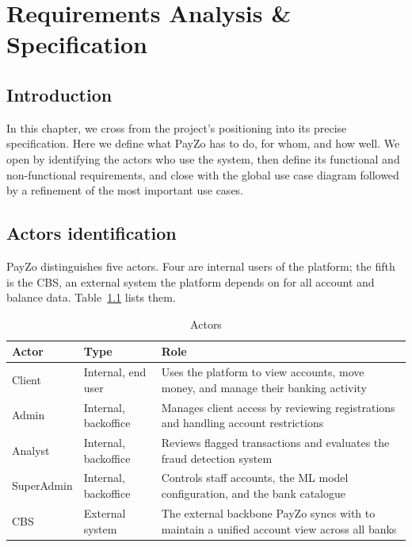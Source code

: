 \documentclass[12pt,a4paper]{report}
\begin{document}
\chapter{Requirements Analysis \& Specification}
\label{chap:requirements}

\section{Introduction}

In this chapter, we cross from the project's positioning into its precise specification. Here
we define what PayZo has to do, for whom, and how well. We open by identifying the actors
who use the system, then define its functional and non-functional requirements, and close
with the global use case diagram followed by a refinement of the most important use cases.

\section{Actors identification}

PayZo distinguishes five actors. Four are internal users of the platform; the fifth is the
CBS, an external system the platform depends on for all account and balance data.
Table~\ref{tab:actors} lists them.

\begin{table}[H]
\centering
\renewcommand{\arraystretch}{1.2}
\begin{tabularx}{\linewidth}{|l|l|>{\raggedright\arraybackslash}X|}
\hline
\textbf{Actor} & \textbf{Type} & \textbf{Role} \\
\hline
Client     & Internal, end user  & Uses the platform to view accounts, move money, and manage their banking activity \\
\hline
Admin      & Internal, backoffice & Manages client access by reviewing registrations and handling account restrictions \\
\hline
Analyst    & Internal, backoffice & Reviews flagged transactions and evaluates the fraud detection system \\
\hline
SuperAdmin & Internal, backoffice & Controls staff accounts, the ML model configuration, and the bank catalogue \\
\hline
CBS        & External system        & The external backbone PayZo syncs with to maintain a unified account view across all banks \\
\hline
\end{tabularx}
\caption{Actors}
\label{tab:actors}
\end{table}
\end{document}
